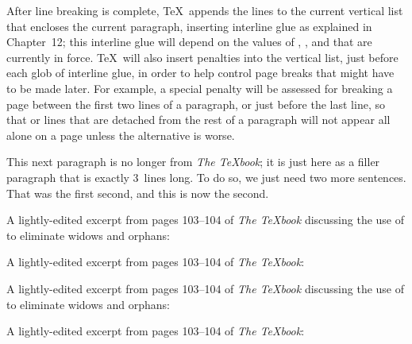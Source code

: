 {    After line breaking is complete, \TeX\ appends the lines to the current vertical list that encloses the current paragraph, inserting interline glue as explained in Chapter~12; this interline glue will depend on the values of , , and  that are currently in force. \TeX\ will also insert penalties into the vertical list, just before each glob of interline glue, in order to help control page breaks that might have to be made later. For example, a special penalty will be assessed for breaking a page between the first two lines of a paragraph, or just before the last line, so that  or  lines that are detached from the rest of a paragraph will not appear all alone on a page unless the alternative is worse.

    This next paragraph is no longer from \emph{The \TeX{}book}; it is just here as a filler paragraph that is exactly 3~lines long. To do so, we just need two more sentences. That was the first second, and this is now the second.
}

\def\widoworphantests{
    \noindent A lightly-edited excerpt from pages 103--104 of \emph{The \TeX{}book} discussing the use of \texcsname{looseness} to eliminate widows and orphans:

    \fillertext

    \pagebreakcommand

    \noindent A lightly-edited excerpt from pages 103--104 of \emph{The \TeX{}book}:

    \fillertext

    \pagebreakcommand
}

\lwcdisable
\widoworphantests

\lwcenable
\widoworphantests
